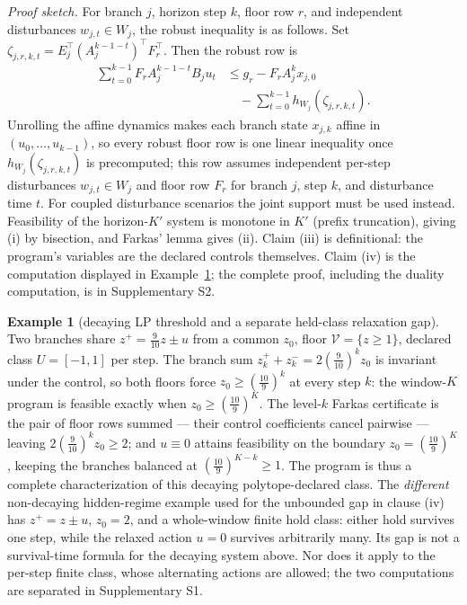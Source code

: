 \documentclass[10pt,twocolumn]{article}
\theoremstyle{definition}
\newtheorem{example}{Example}
\begin{document}
\emph{Proof sketch.} For branch \(j\), horizon step \(k\), floor row \(r\), and independent disturbances \(w_{j,t}\in W_j\), the robust inequality is as follows.
Set \(\zeta_{j,r,k,t}=E_j^{\top}(A_j^{k-1-t})^{\top}F_r^{\top}\). Then the robust row is
\[\begin{aligned}
\sum_{t=0}^{k-1}F_r A_j^{k-1-t}B_j u_t
&\le g_r-F_r A_j^k x_{j,0}\\
&\quad-\sum_{t=0}^{k-1}h_{W_j}(\zeta_{j,r,k,t}).
\end{aligned}\]
Unrolling the affine dynamics makes each branch state
\(x_{j,k}\) affine in \((u_{0},\dots,u_{k-1})\), so every robust floor row is one linear
inequality once \(h_{W_j}(\zeta_{j,r,k,t})\) is precomputed; this row assumes independent per-step disturbances \(w_{j,t}\in W_j\) and floor row \(F_r\) for branch \(j\), step \(k\), and disturbance time \(t\). For coupled disturbance scenarios the joint support must be used instead. Feasibility of the
horizon-\(K'\) system is monotone in \(K'\) (prefix truncation), giving (i) by bisection, and
Farkas' lemma gives (ii). Claim (iii) is definitional: the program's variables are the declared
controls themselves. Claim (iv) is the computation displayed in
Example~\ref{calc-ex:relax-gap}; the complete proof, including the duality computation, is in
Supplementary S2.

\begin{example}[decaying LP threshold and a separate held-class relaxation gap]\label{calc-ex:relax-gap}
Two branches share \(z^{+} = \tfrac{9}{10} z \pm u\) from a common \(z_{0}\), floor
\(\mathcal{V} = \{z \ge 1\}\), declared class \(U = [-1,1]\) per step. The branch sum
\(z^{+}_{k} + z^{-}_{k} = 2 (\tfrac{9}{10})^{k} z_{0}\) is invariant under the control, so both
floors force \(z_{0} \ge (\tfrac{10}{9})^{k}\) at every step \(k\): the window-\(K\) program is
feasible exactly when \(z_{0} \ge (\tfrac{10}{9})^{K}\). The level-\(k\) Farkas certificate is
the pair of floor rows summed --- their control coefficients cancel pairwise --- leaving
\(2(\tfrac{9}{10})^{k} z_{0} \ge 2\); and \(u \equiv 0\) attains feasibility on the boundary
\(z_{0} = (\tfrac{10}{9})^{K}\), keeping the branches balanced at
\((\tfrac{10}{9})^{K-k} \ge 1\). The program is thus a complete characterization of this decaying
polytope-declared class. The \emph{different} non-decaying hidden-regime
example used for the unbounded gap in clause (iv) has
\(z^+=z\pm u\), \(z_0=2\), and a whole-window finite hold class:
either hold survives one step, while the relaxed action \(u=0\)
survives arbitrarily many. Its gap is not a survival-time formula for
the decaying system above. Nor does it apply to the per-step finite
class, whose alternating actions are allowed; the two computations
are separated in Supplementary S1.
\end{example}
\end{document}
